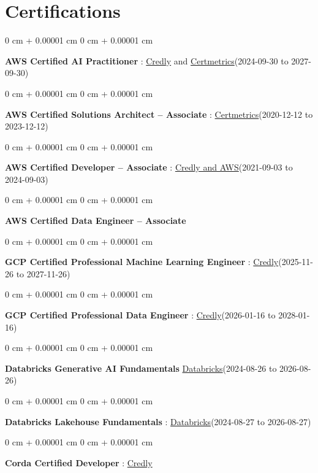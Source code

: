 \documentclass[10pt, letterpaper]{article}
\newenvironment{onecolentry}{
    \begin{adjustwidth}{
        0 cm + 0.00001 cm
    }{
        0 cm + 0.00001 cm
    }
}{
    \end{adjustwidth}
} %
\begin{document}
    \vspace{2 pt }
    \section{Certifications}
        \vspace{2 pt }
        \begin{samepage}
            \begin{onecolentry}
                \textbf{AWS Certified AI Practitioner} : \href{https://www.credly.com/badges/451b7ba5-8be1-4a8e-bbec-ade26627a6b6/public_url}{Credly} and \href{https://cp.certmetrics.com/amazon/en/public/verify/credential/495f0d9853874bf9a33c17f8e89ce131}{Certmetrics}(2024-09-30 to 2027-09-30)
            \end{onecolentry}
            \begin{onecolentry}
                \textbf{AWS Certified Solutions Architect – Associate} : \href{https://cp.certmetrics.com/amazon/en/public/verify/credential/SNBY48EBJJVE1SWX}{Certmetrics}(2020-12-12 to 2023-12-12)
            \end{onecolentry}
            \begin{onecolentry}
                \textbf{AWS Certified Developer – Associate} : \href{https://www.credly.com/badges/b8106fbd-d3d1-4204-8cdf-e708798fd582/public_url}{Credly and AWS}(2021-09-03  to 2024-09-03)
            \end{onecolentry}
            \begin{onecolentry}
                \textbf{AWS Certified Data Engineer – Associate}
            \end{onecolentry}
            \begin{onecolentry}
                \textbf{GCP Certified Professional Machine Learning Engineer} : \href{https://www.credly.com/badges/a6965347-09ea-4d8f-b398-0e151407160d/public_url}{Credly}(2025-11-26 to 2027-11-26)
            \end{onecolentry}
            \begin{onecolentry}
                \textbf{GCP Certified Professional Data Engineer} : \href{https://www.credly.com/badges/977e96d9-12e7-4f6c-b8a7-df71fb7153b8/public_url}{Credly}(2026-01-16 to 2028-01-16)
            \end{onecolentry}
            \begin{onecolentry}
                \textbf{Databricks Generative AI Fundamentals} \href{https://sgq.io/3uIFGNi}{Databricks}(2024-08-26 to 2026-08-26)
            \end{onecolentry}
            \begin{onecolentry}
                \textbf{Databricks Lakehouse Fundamentals} : \href{https://scl.io/FXGKS0u}{Databricks}(2024-08-27 to 2026-08-27)
            \end{onecolentry}
            \begin{onecolentry}
                \textbf{Corda Certified Developer} : \href{https://www.credly.com/badges/7f29d39c-34b6-4de9-b07d-e10f1090a335/linked_in_profile}{Credly}
            \end{onecolentry}
        \end{samepage}
\end{document}
